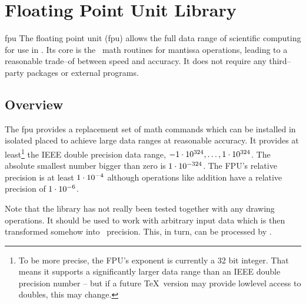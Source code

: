 %
%
%


\section{Floating Point Unit Library}
{}
\label{pgfmath-floatunit}
\label{section-library-fpu}

\begingroup
{}

\begin{pgflibrary}{fpu}
	The floating point unit (fpu) allows the full data range of scientific computing for use in \pgfname. Its core is the \pgfname\ math routines for mantissa operations, leading to a reasonable trade--of between speed and accuracy. It does not require any third--party packages or external programs.
\end{pgflibrary}

\subsection{Overview}
The fpu provides a replacement set of math commands which can be installed in isolated placed to achieve large data ranges at reasonable accuracy. It provides at least\footnote{To be more precise, the FPU's exponent is currently a 32 bit integer. That means it supports a significantly larger data range than an IEEE double precision number -- but if a future \TeX\ version may provide lowlevel access to doubles, this may change.} the IEEE double precision data range, $\pgfmathprintnumber{-1e+324}, \dotsc, \pgfmathprintnumber{+1e324}$. The absolute smallest number bigger than zero is $\pgfmathprintnumber{1e-324}$. The FPU's relative precision is at least $\pgfmathprintnumber{1e-4}$ although operations like addition have a relative precision of $\pgfmathprintnumber{1e-6}$.

Note that the library has not really been tested together with any drawing operations. It should be used to work with arbitrary input data which is then transformed somehow into \pgfname\ precision. This, in turn, can be processed by \pgfname.

